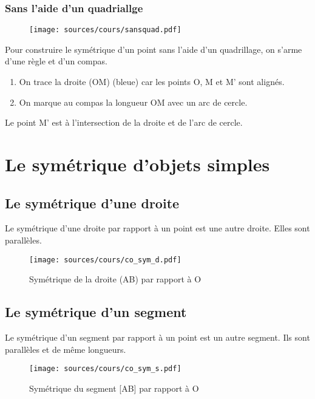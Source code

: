 \documentclass[paper=a4, fontsize=10pt]{scrartcl} %
\begin{document}
\subsubsection{Sans l'aide d'un quadriallge}

\begin{figure}[H]
  \centering
  \texttt{[image: sources/cours/sansquad.pdf]}
  \label{fig:ch2-sansquad}
\end{figure}

Pour construire le symétrique d'un point sans l'aide d'un quadrillage, on s'arme d'une règle et d'un compas. 
\begin{enumerate}
\item On trace la droite (OM) (bleue) car les points O, M et M' sont alignés.
\item On marque au compas la longueur OM avec un arc de cercle. 
\end{enumerate}
Le point M' est à l'intersection de la droite et de l'arc de cercle.

\section{Le symétrique d'objets simples}

\subsection{Le symétrique d'une droite}
Le symétrique d'une droite par rapport à un point est une autre droite. Elles sont parallèles.
\begin{figure}[H]
  \centering
  \texttt{[image: sources/cours/co\_sym\_d.pdf]}
  \caption{Symétrique de la droite (AB) par rapport à O}
  \label{fig:ch2-symd}
\end{figure}


\subsection{Le symétrique d'un segment}
Le symétrique d'un segment par rapport à un point est un autre segment. Ils sont parallèles et de même longueurs.

\begin{figure}[H]
  \centering
  \texttt{[image: sources/cours/co\_sym\_s.pdf]}
  \caption{Symétrique du segment [AB] par rapport à O}
  \label{fig:ch2-syms}
\end{figure}
\end{document}
